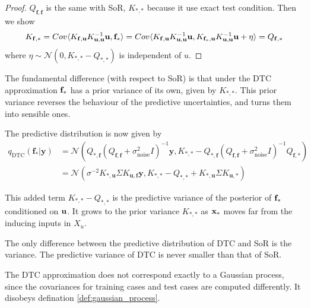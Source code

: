 \documentclass[10pt]{elegantbook}
\begin{document}
\begin{proof}
    $Q_{\mathbf f, \mathbf f}$ is the same with SoR, $K_{*, *}$ because it use exact test condition. Then we show
    \[
        K_{\mathbf f, *} = Cov \langle K_{\mathbf{f,u}}K_{\mathbf{u,u}}^{-1}{\bf u}, \mathbf f_* \rangle 
        = Cov \langle K_{\mathbf{f,u}}K_{\mathbf{u,u}}^{-1}{\bf u}, K_{\mathbf{f_*,u}}K_{\mathbf{u,u}}^{-1} \mathbf u + \eta \rangle 
        = Q_{\mathbf{f,*}}
    \]
    where $\eta \sim \mathcal N(0, K_{*, *} - Q_{*, *})$ is independent of $u$.
\end{proof}

The fundamental difference (with respect to SoR) is that under the DTC approximation $\bf f_*$ has a prior variance of its own,
given by $K_{*, *}$. This prior variance reverses the behaviour of the predictive uncertainties, and turns
them into sensible ones.

The predictive distribution is now given by
\begin{equation}
    \begin{aligned}
    q_{\text{DTC}}(\mathbf f_* | \mathbf y) &= \mathcal N \left (
        Q_{*, \mathbf f} (Q_{\mathbf f, \mathbf f} + \sigma_{\text{noise}}^2 I)^{-1} \mathbf y,
        K_{*, *} - Q_{*, \mathbf f} (Q_{\mathbf f, \mathbf f} + \sigma_{\text{noise}}^2 I)^{-1} Q_{\mathbf f, *}
        \right ) \\
        &= \mathcal N \left (
            \sigma^{-2} K_{*, \mathbf u} \Sigma K_{\mathbf u, \mathbf f} \mathbf y,
            K_{*, *} - Q_{*, *} + K_{*, \mathbf u} \Sigma K_{\mathbf u, *}
            \right )
    \end{aligned}
\end{equation}

This added term $K_{*, *} - Q_{*, *}$ is the
predictive variance of the posterior of $\bf f_*$ conditioned on $\bf u$. It grows to the prior variance $K_{*, *}$ as $\bf x_*$
moves far from the inducing inputs in $X_u$.

\begin{remark}
    The only difference between the predictive distribution of DTC and SoR is the variance.
The predictive variance of DTC is never smaller than that of SoR.
\end{remark}

\begin{remark}
    The DTC approximation does not correspond exactly to a Gaussian process, since the covariances for training cases and test cases are computed differently.
    It disobeys defination \ref{def:gaussian_process}.
\end{remark}
\end{document}
